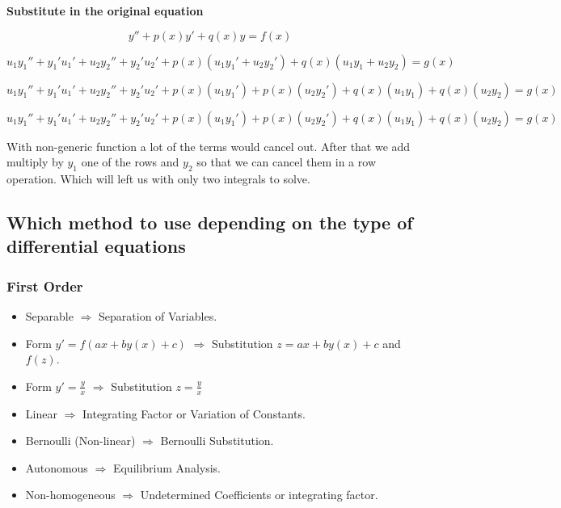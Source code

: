\textbf{Substitute in the original equation}

\[
    y'' + p(x)y' + q(x)y = f(x)
\]

\[
    u_1 y_{1}'' + y_{1}' u_{1}'  + u_2 y_{2}'' + y_{2}' u_{2}' + p(x)(u_1 y_{1}' +  u_2 y_{2}') 
    + q(x)(u_1 y_1 + u_2 y_2) = g(x)  
\]

\[
    u_1 y_{1}'' + y_{1}' u_{1}'  + u_2 y_{2}'' + y_{2}' u_{2}' + p(x)(u_1 y_{1}') + p(x)(u_2 y_{2}') 
    + q(x)(u_1 y_1) + q(x)(u_2 y_2) = g(x)  
\]

\[
    u_1 y_{1}'' + y_{1}' u_{1}'  + u_2 y_{2}'' + y_{2}' u_{2}' + p(x)(u_1 y_{1}') + p(x)(u_2 y_{2}') 
    + q(x)(u_1 y_1) + q(x)(u_2 y_2) = g(x)  
\]

With non-generic function a lot of the terms would cancel out. After that we add multiply by
\(y_1\) one of the rows and \(y_2\) so that we can cancel them in a row operation. Which will left us
with only two integrals to solve.

\subsection{Which method to use depending on the type of differential equations}

\subsubsection{First Order}

\begin{itemize}

    \item Separable \(\Rightarrow\) Separation of Variables.

    \item Form \(y' = f(ax + by(x) + c)\) \(\Rightarrow\) Substitution \(z = ax + by(x) + c\) and \(f(z)\).

    \item Form \(y' = \frac{y}{x}\) \(\Rightarrow\) Substitution \(z = \frac{y}{x}\)

    \item Linear \(\Rightarrow\) Integrating Factor or Variation of Constants.

    \item Bernoulli (Non-linear) \(\Rightarrow\) Bernoulli Substitution.

    \item Autonomous \(\Rightarrow\) Equilibrium Analysis.

    \item Non-homogeneous \(\Rightarrow\) Undetermined Coefficients or integrating factor.

\end{itemize}

